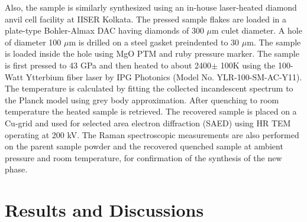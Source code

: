 \documentclass[prb,aps,preprint]{revtex4-2}
\begin{document}
Also, the sample is similarly synthesized using an in-house laser-heated diamond anvil cell facility at IISER Kolkata. The pressed sample flakes are loaded in a plate-type Bohler-Almax DAC having diamonds of 300 $\mu$m culet diameter. A hole of diameter 100 $\mu$m is drilled on a steel gasket preindented to 30 $\mu$m. The sample is loaded inside the hole using MgO PTM and ruby pressure marker. The sample is first pressed to 43 GPa and then heated to about 2400$\pm$ 100K using the 100-Watt Ytterbium fiber laser by IPG Photonics (Model No. YLR-100-SM-AC-Y11). The temperature is calculated by fitting the collected incandescent spectrum to the Planck model using grey body approximation\cite{mukherjee2007high,saha2021temperature}. After quenching to room temperature the heated sample is retrieved. The recovered sample is placed on a Cu-grid and used for selected area electron diffraction (SAED) using HR TEM operating at 200 kV. 
The Raman spectroscopic measurements are also performed on the parent sample powder and the recovered quenched sample at ambient pressure and room temperature, for confirmation of the synthesis of the new phase.
 
\section{Results and Discussions}
\end{document}
